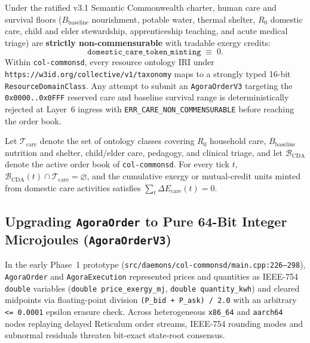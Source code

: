 Under the ratified v3.1 Semantic Commonwealth charter, human care and survival floors ($B_{\mathrm{baseline}}$ nourishment, potable water, thermal shelter, $R_0$ domestic care, child and elder stewardship, apprenticeship teaching, and acute medical triage) are \textbf{strictly non-commensurable} with tradable exergy credits:
\begin{equation}
  \texttt{domestic\_care\_token\_minting} \;\equiv\; 0.
  \label{eq:care-non-commensurability}
\end{equation}
Within \texttt{col-commonsd}, every resource ontology IRI under \texttt{https://w3id.org/collective/v1/taxonomy} maps to a strongly typed 16-bit \texttt{ResourceDomainClass}. Any attempt to submit an \texttt{AgoraOrderV3} targeting the \texttt{0x0000..0x0FFF} reserved care and baseline survival range is deterministically rejected at Layer~6 ingress with \texttt{ERR\_CARE\_NON\_COMMENSURABLE} before reaching the order book.

\begin{invariant}
\label{inv:care-non-commensurability}
Let $\mathcal{T}_{\mathrm{care}}$ denote the set of ontology classes covering $R_0$ household care, $B_{\mathrm{baseline}}$ nutrition and shelter, child/elder care, pedagogy, and clinical triage, and let $\mathcal{B}_{\mathrm{CDA}}$ denote the active order book of \texttt{col-commonsd}. For every tick $t$, $\mathcal{B}_{\mathrm{CDA}}(t) \cap \mathcal{T}_{\mathrm{care}} = \varnothing$, and the cumulative exergy or mutual-credit units minted from domestic care activities satisfies $\sum_{t} \Delta E_{\mathrm{care}}(t) = 0$.
\end{invariant}

\subsection{Upgrading \texttt{AgoraOrder} to Pure 64-Bit Integer Microjoules (\texttt{AgoraOrderV3})}

In the early Phase~1 prototype (\texttt{src/daemons/col-commonsd/main.cpp:226--298}), \texttt{AgoraOrder} and \texttt{AgoraExecution} represented prices and quantities as IEEE-754 \texttt{double} variables (\texttt{double price\_exergy\_mj}, \texttt{double quantity\_kwh}) and cleared midpoints via floating-point division \texttt{(P\_bid + P\_ask) / 2.0} with an arbitrary \texttt{<= 0.0001} epsilon erasure check. Across heterogeneous \texttt{x86\_64} and \texttt{aarch64} nodes replaying delayed Reticulum order streams, IEEE-754 rounding modes and subnormal residuals threaten bit-exact state-root consensus.

